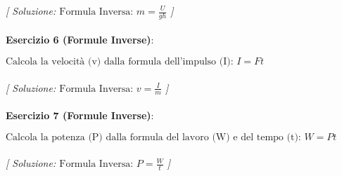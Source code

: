 \documentclass{article}
\begin{document}
\textit{[ Soluzione: $\text{Formula Inversa: } m = \frac{U}{gh}$ ]}\\\\

\textbf{Esercizio 6 (Formule Inverse)}:\\
\par $\text{Calcola la velocit\`a (v) dalla formula dell'impulso (I): } I = Ft$ \\\\

\textit{[ Soluzione: $\text{Formula Inversa: } v = \frac{I}{m}$ ]}\\\\

\textbf{Esercizio 7 (Formule Inverse)}:\\
\par $\text{Calcola la potenza (P) dalla formula del lavoro (W) e del tempo (t): } W = Pt$ \\\\

\textit{[ Soluzione: $\text{Formula Inversa: } P = \frac{W}{t}$ ]}\\\\
\end{document}
